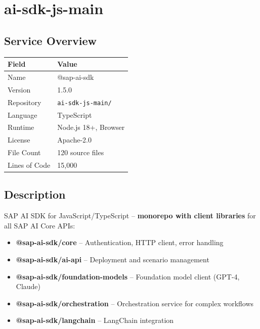 \documentclass[11pt,a4paper]{article}
\begin{document}
\newpage

\section{ai-sdk-js-main}

\subsection{Service Overview}

\begin{tabular}{@{}L{4cm}L{10cm}@{}}
\toprule
\textbf{Field} & \textbf{Value} \\
\midrule
Name & @sap-ai-sdk \\
Version & 1.5.0 \\
Repository & \texttt{ai-sdk-js-main/} \\
Language & TypeScript \\
Runtime & Node.js 18+, Browser \\
License & Apache-2.0 \\
File Count & 120 source files \\
Lines of Code & 15,000 \\
\bottomrule
\end{tabular}

\subsection{Description}

SAP AI SDK for JavaScript/TypeScript -- \textbf{monorepo with client libraries} for all SAP AI Core APIs:

\begin{itemize}[noitemsep]
    \item \textbf{@sap-ai-sdk/core} -- Authentication, HTTP client, error handling
    \item \textbf{@sap-ai-sdk/ai-api} -- Deployment and scenario management
    \item \textbf{@sap-ai-sdk/foundation-models} -- Foundation model client (GPT-4, Claude)
    \item \textbf{@sap-ai-sdk/orchestration} -- Orchestration service for complex workflows
    \item \textbf{@sap-ai-sdk/langchain} -- LangChain integration
\end{itemize}
\end{document}
